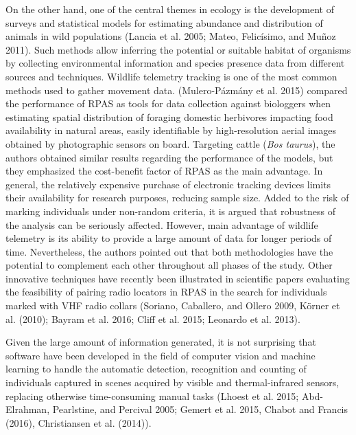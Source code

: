 \documentclass[]{interact}
\theoremstyle{plain}%
\theoremstyle{definition}
\theoremstyle{remark}
\begin{document}
On the other hand, one of the central themes in ecology is the
development of surveys and statistical models for estimating abundance
and distribution of animals in wild populations (Lancia et al. 2005;
Mateo, Felicísimo, and Muñoz 2011). Such methods allow inferring the
potential or suitable habitat of organisms by collecting environmental
information and species presence data from different sources and
techniques. Wildlife telemetry tracking is one of the most common
methods used to gather movement data. (Mulero-Pázmány et al. 2015)
compared the performance of RPAS as tools for data collection against
biologgers when estimating spatial distribution of foraging domestic
herbivores impacting food availability in natural areas, easily
identifiable by high-resolution aerial images obtained by photographic
sensors on board. Targeting cattle (\emph{Bos taurus}), the authors
obtained similar results regarding the performance of the models, but
they emphasized the cost-benefit factor of RPAS as the main advantage.
In general, the relatively expensive purchase of electronic tracking
devices limits their availability for research purposes, reducing sample
size. Added to the risk of marking individuals under non-random
criteria, it is argued that robustness of the analysis can be seriously
affected. However, main advantage of wildlife telemetry is its ability
to provide a large amount of data for longer periods of time.
Nevertheless, the authors pointed out that both methodologies have the
potential to complement each other throughout all phases of the study.
Other innovative techniques have recently been illustrated in scientific
papers evaluating the feasibility of pairing radio locators in RPAS in
the search for individuals marked with VHF radio collars (Soriano,
Caballero, and Ollero 2009, Körner et al. (2010); Bayram et al. 2016;
Cliff et al. 2015; Leonardo et al. 2013).

Given the large amount of information generated, it is not surprising
that software have been developed in the field of computer vision and
machine learning to handle the automatic detection, recognition and
counting of individuals captured in scenes acquired by visible and
thermal-infrared sensors, replacing otherwise time-consuming manual
tasks (Lhoest et al. 2015; Abd-Elrahman, Pearlstine, and Percival 2005;
Gemert et al. 2015, Chabot and Francis (2016), Christiansen et al.
(2014)).
\end{document}
